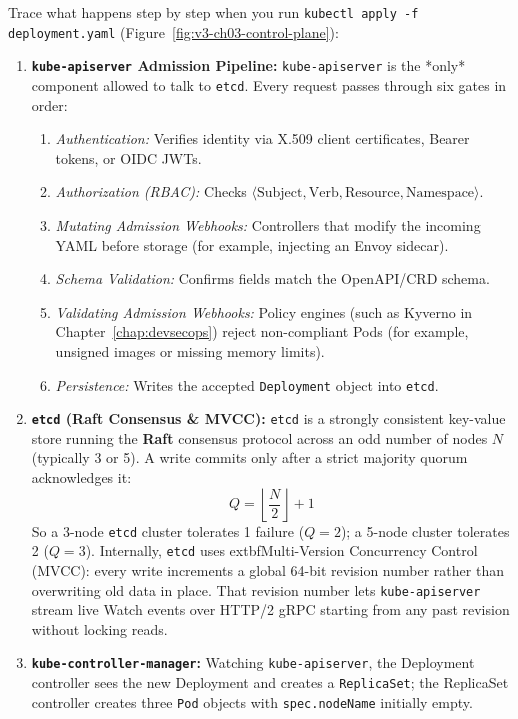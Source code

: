 Trace what happens step by step when you run \texttt{kubectl apply -f deployment.yaml} (Figure~\ref{fig:v3-ch03-control-plane}):
\begin{enumerate}[leftmargin=15pt]
  \item \textbf{\texttt{kube-apiserver} Admission Pipeline:} \texttt{kube-apiserver} is the *only* component allowed to talk to \texttt{etcd}. Every request passes through six gates in order:
  \begin{enumerate}[label=\alph*., leftmargin=12pt]
    \item \emph{Authentication:} Verifies identity via X.509 client certificates, Bearer tokens, or OIDC JWTs.
    \item \emph{Authorization (RBAC):} Checks $\langle \text{Subject}, \text{Verb}, \text{Resource}, \text{Namespace} \rangle$.
    \item \emph{Mutating Admission Webhooks:} Controllers that modify the incoming YAML before storage (for example, injecting an Envoy sidecar).
    \item \emph{Schema Validation:} Confirms fields match the OpenAPI/CRD schema.
    \item \emph{Validating Admission Webhooks:} Policy engines (such as Kyverno in Chapter~\ref{chap:devsecops}) reject non-compliant Pods (for example, unsigned images or missing memory limits).
    \item \emph{Persistence:} Writes the accepted \texttt{Deployment} object into \texttt{etcd}.
  \end{enumerate}
  \item \textbf{\texttt{etcd} (Raft Consensus \& MVCC):} \texttt{etcd} is a strongly consistent key-value store running the \textbf{Raft} consensus protocol across an odd number of nodes $N$ (typically 3 or 5). A write commits only after a strict majority quorum acknowledges it:
  \begin{equation}
  Q = \left\lfloor \frac{N}{2} \right\rfloor + 1
  \end{equation}
  So a 3-node \texttt{etcd} cluster tolerates 1 failure ($Q=2$); a 5-node cluster tolerates 2 ($Q=3$). Internally, \texttt{etcd} uses 	extbf{Multi-Version Concurrency Control (MVCC)}: every write increments a global 64-bit revision number rather than overwriting old data in place. That revision number lets \texttt{kube-apiserver} stream live Watch events over HTTP/2 gRPC starting from any past revision without locking reads.
  \item \textbf{\texttt{kube-controller-manager}:} Watching \texttt{kube-apiserver}, the Deployment controller sees the new Deployment and creates a \texttt{ReplicaSet}; the ReplicaSet controller creates three \texttt{Pod} objects with \texttt{spec.nodeName} initially empty.

\end{enumerate}

